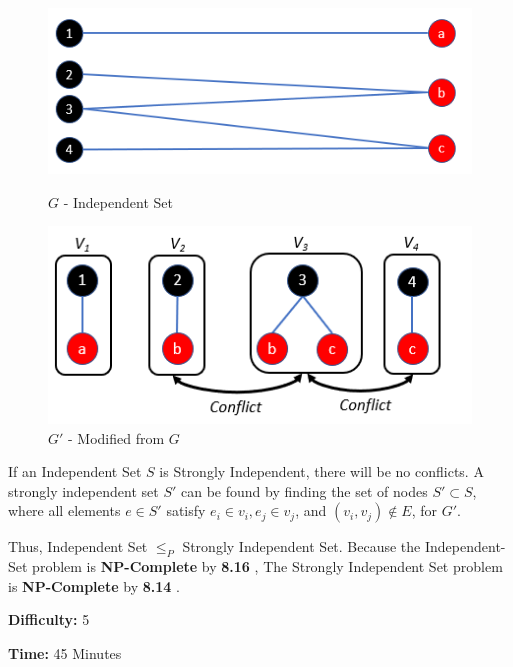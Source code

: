 \documentclass{article}
\begin{document}
\begin{figure}[!h]
  \centering
  \begin{minipage}[b]{0.45\textwidth}
    \includegraphics[width=.9\textwidth]{Images/Independent.png}
    \caption{$G$ - Independent Set}
  \end{minipage}
  \hfill
  \begin{minipage}[b]{0.45\textwidth}
    \includegraphics[width=.9\textwidth]{Images/Strong_Independent.png}
    \caption{$G'$ - Modified from $G$}
  \end{minipage}
\end{figure}

\noindent If an Independent Set $S$ is Strongly Independent, there will be no conflicts.  A strongly independent set $S'$ can be found by finding the set of nodes $S' \subset S$, where all elements $e \in S'$ satisfy $e_i \in v_i, e_j \in v_j$, and $(v_i, v_j) \notin E$, for $G'$.

\noindent Thus, Independent Set $\leq_P$ Strongly Independent Set. 
Because the Independent-Set problem is \textbf{NP-Complete} by \textbf{8.16} \cite{algDesign}, 
The Strongly Independent Set problem is \textbf{NP-Complete} by \textbf{8.14} \cite{algDesign}.

\noindent \textbf{Difficulty:}  5

\noindent \textbf{Time:}  45 Minutes

\printbibliography
\end{document}
